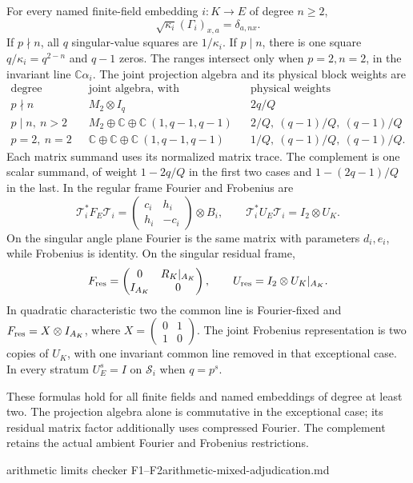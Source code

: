 \begin{proposition}
\statusProved\quad
For every named finite-field embedding $i:K\to E$ of degree $n\geq2$,
\[
 \sqrt{\kappa_i}(\Gamma_i)_{x,a}=\delta_{a,nx}.
\]
If $p\nmid n$, all $q$ singular-value squares are $1/\kappa_i$.
If $p\mid n$, there is one square $q/\kappa_i=q^{2-n}$ and $q-1$ zeros.
The ranges intersect only when $p=2,n=2$, in the invariant line
$\mathbb C\alpha_i$.
The joint projection algebra and its physical block weights are
\[
\begin{array}{c|c|c}
 \text{degree stratum}&\text{joint algebra, with multiplicities}&
 \text{physical weights}\\ \hline
 p\nmid n&M_2\otimes I_q&2q/Q\\
 p\mid n,\ n>2&M_2\oplus\mathbb C\oplus\mathbb C\ (1,q-1,q-1)&
 2/Q,\ (q-1)/Q,\ (q-1)/Q\\
 p=2,\ n=2&\mathbb C\oplus\mathbb C\oplus\mathbb C\ (1,q-1,q-1)&
 1/Q,\ (q-1)/Q,\ (q-1)/Q.
\end{array}
\]
Each matrix summand uses its normalized matrix trace. The complement is
one scalar summand, of weight $1-2q/Q$ in the first two cases and
$1-(2q-1)/Q$ in the last.
In the regular frame Fourier and Frobenius are
\[
 \mathcal T_i^*F_E\mathcal T_i
 =\begin{pmatrix}c_i&h_i\\h_i&-c_i\end{pmatrix}\otimes B_i,
 \qquad
 \mathcal T_i^*U_E\mathcal T_i=I_2\otimes U_K.
\]
On the singular angle plane Fourier is the same matrix with parameters
$d_i,e_i$, while Frobenius is identity. On the singular residual frame,
\[
 F_{\rm res}=\begin{pmatrix}0&R_K|_{A_K}\\I_{A_K}&0\end{pmatrix},
 \qquad U_{\rm res}=I_2\otimes U_K|_{A_K}.
\]
In quadratic characteristic two the common line is Fourier-fixed and
$F_{\rm res}=X\otimes I_{A_K}$, where
$X=\left(\begin{smallmatrix}0&1\\1&0\end{smallmatrix}\right)$.
The joint Frobenius representation is two copies of $U_K$, with one
invariant common line removed in that exceptional case. In every stratum
$U_E^s=I$ on $\mathcal S_i$ when $q=p^s$.
\end{proposition}
\begin{scope}
These formulas hold for all finite fields and named embeddings of degree
at least two. The projection algebra alone is commutative in the exceptional
case; its residual matrix factor additionally uses compressed Fourier.
The complement retains the actual ambient Fourier and Frobenius restrictions.
\end{scope}
{arithmetic limits checker F1--F2}{arithmetic-mixed-adjudication.md}

